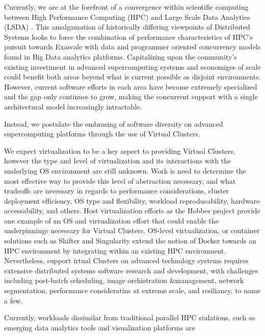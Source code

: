 Currently, we are at the forefront of a convergence within scientific computing between High Performance Computing (HPC) and Large Scale Data Analytics (LSDA) \cite{reed2015exascale, leeland2016}. This amalgamation of historically differing viewpoints of Distributed Systems looks to force the combination of performance characteristics of HPC's pursuit towards Exascale with data and programmer oriented concurrency models found in Big Data analytics platforms.  Capitalizing upon the community's existing investiment in advanced supercomputing systems and economiges of scale could benefit both areas beyond what is current possible as disjoint environments.  However, current software efforts in each area have become extremely specialized and the gap only continues to grow, making the concurrent support with a single architectural model increasingly intractable.

Instead, we postulate the embrasing of software diversity on advanced supercomputing platforms through the use of Virtual Clusters.  




We expect virtualization to be a key aspect to providing Virtual Clusters, however the type and level of virtualization and its interactions with the underlying OS environment are still unknown.  Work is need to determine the most effective way to provide this level of abstraction necessary, and what tradeoffs are necessary in regards to performance considerations, cluster deployment efficiency, OS type and flexibility, workload reproducability, hardware accessability, and others.  Host virtualization efforts as the Hobbes project \cite{hobbes} provide one example of an OS and virtualization effort that could enable the underpinnings necessary for Virtual Clusters.  OS-level virtualization, or container solutions such as Shifter and Singularity \cite{shiftercug2016, singularity} extend the notion of Docker towards an HPC environment by integrating within an existing HPC environment. Nevertheless, support irtual Clusters on advanced technology systems requires extensive distributed systems software research and development, with challenges including post-batch scheduling, image orchistration \&management, network segmentation, performance consideratins at extreme scale, and resiliancy, to name a few.



Currently, workloads dissimilar from traditional parallel HPC siulations, such as emerging data analytics tools and visualization platforms are 

